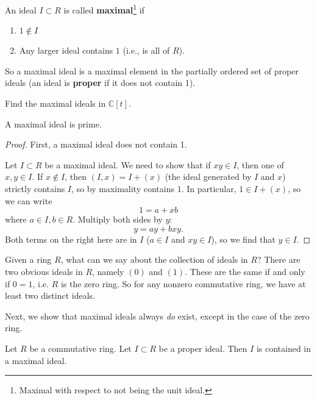 \begin{definition} \label{maximalideal}
An ideal $I \subset R$ is called \textbf{maximal}\footnote{Maximal with
respect to not being the unit ideal.} if 
\begin{enumerate}[\textbf{M} 1]
\item  $1 \notin I$
\item Any larger ideal contains $1$ (i.e., is all of $R$).
\end{enumerate}
\end{definition} 

So a maximal ideal is a maximal element in the partially ordered set of proper
ideals (an ideal is \textbf{proper} if it does not contain 1).

\begin{exercise} 
Find the maximal ideals in $\mathbb{C}[t]$.
\end{exercise} 


\begin{proposition} 
A maximal ideal is prime.
\end{proposition} 
\begin{proof} 
First, a maximal ideal does not contain 1.

Let $I \subset R$ be a maximal ideal.
We need to show that if $xy \in I$,
then one of $x,y \in I$.  If $x \notin I$, then $(I,x) = I + (x)$ (the ideal
generated by $I$ and $x$) strictly contains $I$, so by maximality contains
$1$.  In particular, $1 \in I+(x)$, so we can write
\[ 1 = a + xb  \]
where $a \in I, b \in R$. Multiply both sides by $y$:
\[ y = ay  + bxy.  \]
Both terms on the right here are in $I$ ($a \in I$ and $xy \in I$), so we find
that $y \in I$.

\end{proof} 

Given a ring $R$, what can we say about the collection of ideals in $R$?
There
are two obvious ideals in $R$, namely $(0)$ and $ (1)$.  These are the same if and
only if $0=1$, i.e. $R$ is the zero ring.
So for any nonzero commutative ring, we have at least two distinct ideals.  

Next, we show that maximal ideals always \emph{do} exist, except in the case
of the zero ring. 
\begin{proposition} \label{anycontainedinmaximal}
Let $R$ be a commutative ring. Let $I \subset R$ be a proper ideal.  Then $I$
is contained in a maximal ideal.
\end{proposition} 

